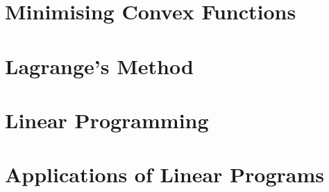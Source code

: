 \documentclass[british,11pt,a4paper]{report}
\begin{document}
\maketitle
\tableofcontents
\chapter{Minimising Convex Functions}

\chapter{Lagrange's Method}

\chapter{Linear Programming}

\chapter{Applications of Linear Programs}

\end{document}
